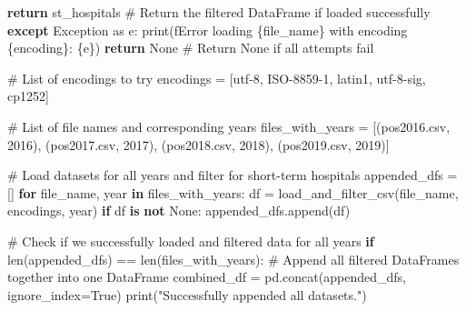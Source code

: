\documentclass[
  letterpaper,
  DIV=11,
  numbers=noendperiod]{scrartcl}
\newenvironment{Shaded}{\begin{snugshade}}{\end{snugshade}}
\newcommand{\BuiltInTok}[1]{\textcolor[rgb]{0.00,0.23,0.31}{#1}}
\newcommand{\CommentTok}[1]{\textcolor[rgb]{0.37,0.37,0.37}{#1}}
\newcommand{\ControlFlowTok}[1]{\textcolor[rgb]{0.00,0.23,0.31}{\textbf{#1}}}
\newcommand{\DecValTok}[1]{\textcolor[rgb]{0.68,0.00,0.00}{#1}}
\newcommand{\ImportTok}[1]{\textcolor[rgb]{0.00,0.46,0.62}{#1}}
\newcommand{\KeywordTok}[1]{\textcolor[rgb]{0.00,0.23,0.31}{\textbf{#1}}}
\newcommand{\NormalTok}[1]{\textcolor[rgb]{0.00,0.23,0.31}{#1}}
\newcommand{\OperatorTok}[1]{\textcolor[rgb]{0.37,0.37,0.37}{#1}}
\newcommand{\PreprocessorTok}[1]{\textcolor[rgb]{0.68,0.00,0.00}{#1}}
\newcommand{\SpecialCharTok}[1]{\textcolor[rgb]{0.37,0.37,0.37}{#1}}
\newcommand{\SpecialStringTok}[1]{\textcolor[rgb]{0.13,0.47,0.30}{#1}}
\newcommand{\StringTok}[1]{\textcolor[rgb]{0.13,0.47,0.30}{#1}}
\newcommand{\VariableTok}[1]{\textcolor[rgb]{0.07,0.07,0.07}{#1}}
\begin{document}
\begin{Shaded}
\begin{Highlighting}[]
            \ControlFlowTok{return}\NormalTok{ st\_hospitals  }\CommentTok{\# Return the filtered DataFrame if loaded successfully}
        \ControlFlowTok{except} \PreprocessorTok{Exception} \ImportTok{as}\NormalTok{ e:}
            \BuiltInTok{print}\NormalTok{(}\SpecialStringTok{f\textquotesingle{}Error loading }\SpecialCharTok{\{}\NormalTok{file\_name}\SpecialCharTok{\}}\SpecialStringTok{ with encoding }\SpecialCharTok{\{}\NormalTok{encoding}\SpecialCharTok{\}}\SpecialStringTok{: }\SpecialCharTok{\{}\NormalTok{e}\SpecialCharTok{\}}\SpecialStringTok{\textquotesingle{}}\NormalTok{)}
    \ControlFlowTok{return} \VariableTok{None}  \CommentTok{\# Return None if all attempts fail}


\CommentTok{\# List of encodings to try}
\NormalTok{encodings }\OperatorTok{=}\NormalTok{ [}\StringTok{\textquotesingle{}utf{-}8\textquotesingle{}}\NormalTok{, }\StringTok{\textquotesingle{}ISO{-}8859{-}1\textquotesingle{}}\NormalTok{, }\StringTok{\textquotesingle{}latin1\textquotesingle{}}\NormalTok{, }\StringTok{\textquotesingle{}utf{-}8{-}sig\textquotesingle{}}\NormalTok{, }\StringTok{\textquotesingle{}cp1252\textquotesingle{}}\NormalTok{]}

\CommentTok{\# List of file names and corresponding years}
\NormalTok{files\_with\_years }\OperatorTok{=}\NormalTok{ [(}\StringTok{\textquotesingle{}pos2016.csv\textquotesingle{}}\NormalTok{, }\DecValTok{2016}\NormalTok{), (}\StringTok{\textquotesingle{}pos2017.csv\textquotesingle{}}\NormalTok{, }\DecValTok{2017}\NormalTok{),}
\NormalTok{                    (}\StringTok{\textquotesingle{}pos2018.csv\textquotesingle{}}\NormalTok{, }\DecValTok{2018}\NormalTok{), (}\StringTok{\textquotesingle{}pos2019.csv\textquotesingle{}}\NormalTok{, }\DecValTok{2019}\NormalTok{)]}

\CommentTok{\# Load datasets for all years and filter for short{-}term hospitals}
\NormalTok{appended\_dfs }\OperatorTok{=}\NormalTok{ []}
\ControlFlowTok{for}\NormalTok{ file\_name, year }\KeywordTok{in}\NormalTok{ files\_with\_years:}
\NormalTok{    df }\OperatorTok{=}\NormalTok{ load\_and\_filter\_csv(file\_name, encodings, year)}
    \ControlFlowTok{if}\NormalTok{ df }\KeywordTok{is} \KeywordTok{not} \VariableTok{None}\NormalTok{:}
\NormalTok{        appended\_dfs.append(df)}

\CommentTok{\# Check if we successfully loaded and filtered data for all years}
\ControlFlowTok{if} \BuiltInTok{len}\NormalTok{(appended\_dfs) }\OperatorTok{==} \BuiltInTok{len}\NormalTok{(files\_with\_years):}
    \CommentTok{\# Append all filtered DataFrames together into one DataFrame}
\NormalTok{    combined\_df }\OperatorTok{=}\NormalTok{ pd.concat(appended\_dfs, ignore\_index}\OperatorTok{=}\VariableTok{True}\NormalTok{)}
    \BuiltInTok{print}\NormalTok{(}\StringTok{"Successfully appended all datasets."}\NormalTok{)}


\end{Highlighting}
\end{Shaded}
\end{document}
